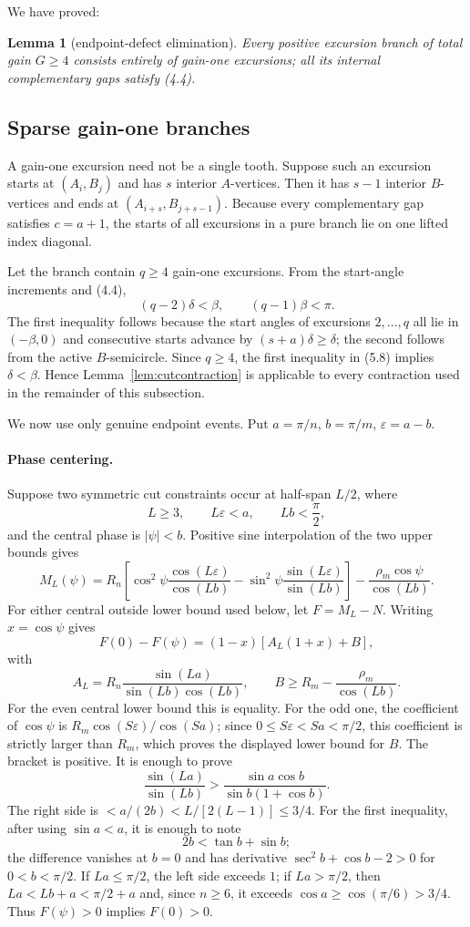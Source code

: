 \documentclass[11pt]{article}
\newtheorem{lemma}[theorem]{Lemma}
\theoremstyle{remark}
\begin{document}
We have proved:

\begin{lemma}[endpoint-defect elimination]\label{lem:endpointdefect}
Every positive excursion branch of total gain $G\ge4$ consists entirely of gain-one excursions; all its internal complementary gaps satisfy (4.4).
\end{lemma}

\subsection{Sparse gain-one branches}

A gain-one excursion need not be a single tooth. Suppose such an excursion starts at $(A_i,B_j)$ and has $s$ interior $A$-vertices. Then it has $s-1$ interior $B$-vertices and ends at $(A_{i+s},B_{j+s-1})$. Because every complementary gap satisfies $c=a+1$, the starts of all excursions in a pure branch lie on one lifted index diagonal.

Let the branch contain $q\ge4$ gain-one excursions. From the start-angle increments and (4.4),
\[
(q-2)\delta<\beta,
\qquad
(q-1)\beta<\pi.
\tag{5.8}
\]
The first inequality follows because the start angles of excursions $2,\dots,q$ all lie in $(-\beta,0)$ and consecutive starts advance by $(s+a)\delta\ge\delta$; the second follows from the active $B$-semicircle. Since $q\ge4$, the first inequality in (5.8) implies $\delta<\beta$. Hence Lemma~\ref{lem:cutcontraction} is applicable to every contraction used in the remainder of this subsection.

We now use only genuine endpoint events. Put $a=\pi/n$, $b=\pi/m$, $\varepsilon=a-b$.

\paragraph{Phase centering.}
Suppose two symmetric cut constraints occur at half-span $L/2$, where
\[
L\ge3,\qquad L\varepsilon<a,\qquad Lb<\frac\pi2,
\]
and the central phase is $|\psi|<b$. Positive sine interpolation of the two upper bounds gives
\[
M_L(\psi)=R_n\left[
\cos^2\psi\frac{\cos(L\varepsilon)}{\cos(Lb)}
-\sin^2\psi\frac{\sin(L\varepsilon)}{\sin(Lb)}
\right]-\frac{\rho_m\cos\psi}{\cos(Lb)}.
\tag{5.9}
\]
For either central outside lower bound used below, let $F=M_L-N$. Writing $x=\cos\psi$ gives
\[
F(0)-F(\psi)=(1-x)[A_L(1+x)+B],
\]
with
\[
A_L=R_n\frac{\sin(La)}{\sin(Lb)\cos(Lb)},
\qquad B\ge R_m-\frac{\rho_m}{\cos(Lb)}.
\]
For the even central lower bound this is equality. For the odd one, the coefficient of $\cos\psi$ is $R_m\cos(S\varepsilon)/\cos(Sa)$; since $0\le S\varepsilon<Sa<\pi/2$, this coefficient is strictly larger than $R_m$, which proves the displayed lower bound for $B$. The bracket is positive. It is enough to prove
\[
\frac{\sin(La)}{\sin(Lb)}>
\frac{\sin a\cos b}{\sin b(1+\cos b)}.
\tag{5.10}
\]
The right side is $<a/(2b)<L/[2(L-1)]\le3/4$. For the first inequality, after using $\sin a<a$, it is enough to note
\[
2b<\tan b+\sin b;
\]
the difference vanishes at $b=0$ and has derivative $\sec^2b+\cos b-2>0$ for $0<b<\pi/2$. If $La\le\pi/2$, the left side exceeds $1$; if $La>\pi/2$, then $La<Lb+a<\pi/2+a$ and, since $n\ge6$, it exceeds $\cos a\ge\cos(\pi/6)>3/4$. Thus $F(\psi)>0$ implies $F(0)>0$.
\end{document}
